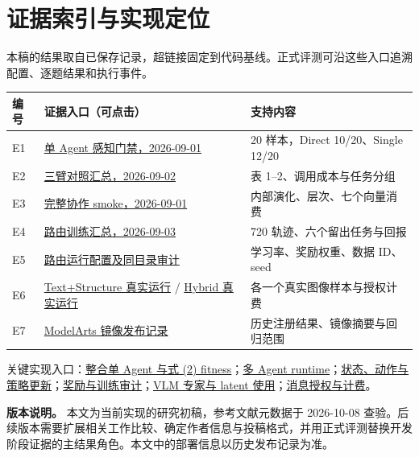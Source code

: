 \documentclass[UTF8,a4paper,zihao=5,fontset=fandol]{ctexart}
\newcommand{\evref}[2]{\href{https://github.com/wsaitr/EvoRS-rl/blob/530914e2d39847de29249cecf0dd1a663cea5f1c/#1}{#2}}
\begin{document}
\appendix
\section{证据索引与实现定位}
\noindent 本稿的结果取自已保存记录，超链接固定到代码基线。正式评测可沿这些入口追溯配置、逐题结果和执行事件。

\begin{table}[h]
\centering\small
\begin{tabularx}{\textwidth}{p{15mm}YY}
\toprule
编号 & 证据入口（可点击） & 支持内容\\
\midrule
E1 & \evref{evidence/2026-09-01_single_agent_perception_gate/README.md}{单 Agent 感知门禁，2026-09-01} & 20 样本，Direct 10/20、Single 12/20\\
E2 & \evref{evidence/2026-09-02_phase4_comparison/summary.json}{三臂对照汇总，2026-09-02} & 表 1--2、调用成本与任务分组\\
E3 & \evref{evidence/2026-09-01_multi_agent_framework/VERIFICATION.md}{完整协作 smoke，2026-09-01} & 内部演化、层次、七个向量消费\\
E4 & \evref{evidence/2026-09-03_phase5_routing/summary.json}{路由训练汇总，2026-09-03} & 720 轨迹、六个留出任务与回报\\
E5 & \evref{evidence/2026-09-03_phase5_routing/run_config.json}{路由运行配置及同目录审计} & 学习率、奖励权重、数据 ID、seed\\
E6 & \evref{evidence/2026-09-03_phase5_real_qwen_smoke/summary.json}{Text+Structure 真实运行} / \evref{evidence/2026-09-03_phase5_real_qwen_hybrid_smoke/summary.json}{Hybrid 真实运行} & 各一个真实图像样本与授权计费\\
E7 & \evref{evidence/2026-09-19_modelarts_image/REPORT.md}{ModelArts 镜像发布记录} & 历史注册结果、镜像摘要与回归范围\\
\bottomrule
\end{tabularx}
\end{table}

\noindent 关键实现入口：\evref{src/rs_hmcomm/runtime/integrated_single_agent.py}{整合单 Agent 与式 (2) fitness}；\evref{src/rs_hmcomm/runtime/multi_agent.py}{多 Agent runtime}；\evref{src/rs_hmcomm/control/learned_policy.py}{状态、动作与策略更新}；\evref{src/rs_hmcomm/rl/routing.py}{奖励与训练审计}；\evref{src/rs_hmcomm/experts/vlm_mechanisms.py}{VLM 专家与 latent 使用}；\evref{src/rs_hmcomm/communication/routing.py}{消息授权与计费}。

\vspace{6pt}
\noindent\textbf{版本说明。} 本文为当前实现的研究初稿，参考文献元数据于 2026-10-08 查验。后续版本需要扩展相关工作比较、确定作者信息与投稿格式，并用正式评测替换开发阶段证据的主结果角色。本文中的部署信息以历史发布记录为准。
\end{document}
